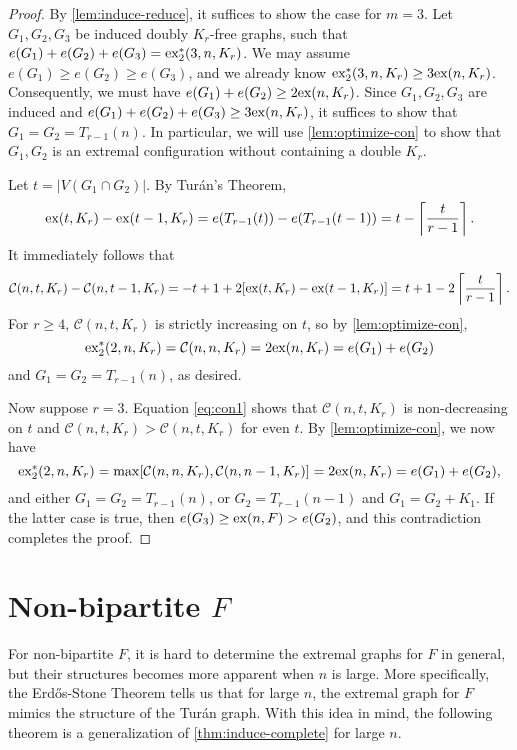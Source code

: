 \documentclass[10pt, reqno]{report}
\newcommand*{\ex}{\textnormal{ex}}
\newcommand*{\dex}{\textnormal{ex}_2}
\newcommand*{\con}{\mathcal{C}}
\begin{document}
\begin{proof}
  By \cref{lem:induce-reduce}, it suffices to show the case for $m = 3$. Let $G_1, G_2, G_3$ be induced doubly $K_r$-free graphs, such that $e(G_1) + e(G_2) + e(G_3) = \dex^*(3, n, K_r)$. We may assume $e(G_1) \geq e(G_2) \geq e(G_3)$, and we already know $\dex^*(3, n, K_r) \geq 3\ex(n, K_r)$. Consequently, we must have $e(G_1) + e(G_2) \geq 2\ex(n, K_r)$. Since $G_1, G_2, G_3$ are induced and $e(G_1) + e(G_2) + e(G_3) \geq 3\ex(n, K_r)$, it suffices to show that $G_1 = G_2 = T_{r - 1}(n)$. In particular, we will use \cref{lem:optimize-con} to show that $G_1, G_2$ is an extremal configuration without containing a double $K_r$. 

  Let $t = |V(G_1 \cap G_2)|$. By Turán's Theorem,
  \[
    \ex(t, K_{r}) - \ex(t - 1, K_{r}) = e(T_{r - 1}(t)) - e(T_{r - 1}(t - 1)) = t - \left\lceil \frac{t}{r - 1} \right\rceil.
  \]
  It immediately follows that
  \begin{equation}
    \con(n, t, K_r) - \con(n, t - 1, K_r) = - t + 1 + 2[\ex(t, K_r) - \ex(t - 1, K_r)] = t + 1 - 2\left\lceil \frac{t}{r - 1} \right\rceil. \label{eq:con1}
  \end{equation}
  For $r \geq 4$, $\con(n, t, K_r)$ is strictly increasing on $t$, so by \cref{lem:optimize-con}, 
  \[
    \dex^*(2, n, K_r) = \con(n, n, K_r) = 2\ex(n, K_r) = e(G_1) + e(G_2)
  \]
  and $G_1 = G_2 = T_{r - 1}(n)$, as desired. 

  Now suppose $r = 3$. Equation \eqref{eq:con1} shows that $\con(n, t, K_r)$ is non-decreasing on $t$ and $\con(n, t, K_r) > \con(n, t, K_r)$ for even $t$. By \cref{lem:optimize-con}, we now have 
  \[
    \dex^*(2, n, K_r) = \max[\con(n, n, K_r), \con(n, n - 1, K_r)] = 2\ex(n, K_r) = e(G_1) + e(G_2),
  \]
  and either $G_1 = G_2 = T_{r - 1}(n)$, or $G_2 = T_{r - 1}(n - 1)$ and $G_1 = G_2 + K_1$. If the latter case is true, then $e(G_3) \geq \ex(n, F) > e(G_2)$, and this contradiction completes the proof.
\end{proof}

\section{Non-bipartite $F$}

For non-bipartite $F$, it is hard to determine the extremal graphs for $F$ in general, but their structures becomes more apparent when $n$ is large. More specifically, the Erdős-Stone Theorem tells us that for large $n$, the extremal graph for $F$ mimics the structure of the Turán graph. With this idea in mind, the following theorem is a generalization of \cref{thm:induce-complete} for large $n$.
\end{document}
